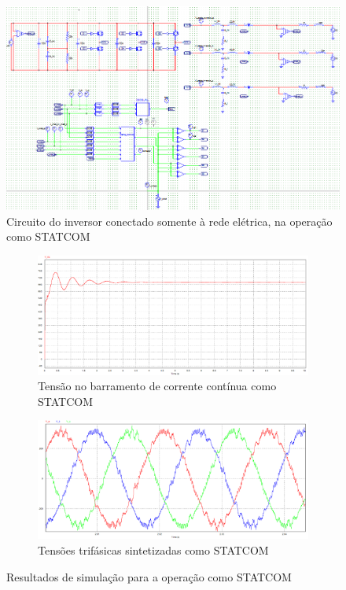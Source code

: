 \begin{figure}[!hbt]
	\begin{center}
    \includegraphics[width=\textwidth]{figuras/sim_figures/statcom/circuito.PNG}
    \caption{Circuito do inversor conectado somente à rede elétrica, na operação como STATCOM}
    \label{fig:sim-circuito-statcom}
    \end{center}
\end{figure}

\begin{figure}[!hbt]
	\centering
	\begin{subfigure}[b]{0.7\textwidth}
		\centering
		\includegraphics[width=\textwidth]{figuras/sim_figures/statcom/barramento-cc.PNG}
		\caption{Tensão no barramento de corrente contínua como STATCOM}
	\end{subfigure}
	
	\begin{subfigure}[b]{0.7\textwidth}
		\centering
		\includegraphics[width=\textwidth]{figuras/sim_figures/statcom/tensoes-trifasicas.PNG}
		\caption{Tensões trifásicas sintetizadas como STATCOM}
	\end{subfigure}

	\caption{Resultados de simulação para a operação como STATCOM}
    \label{fig:sim-statcom}
\end{figure}

